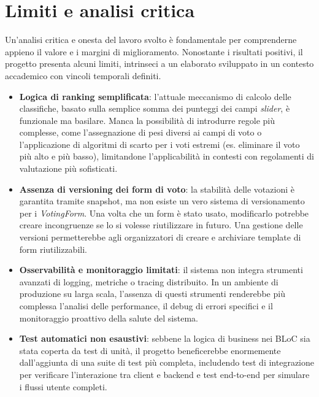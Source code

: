 \section{Limiti e analisi critica}\label{sec:limiti-e-analisi-critica}
Un'analisi critica e onesta del lavoro svolto è fondamentale per comprenderne appieno il valore e i margini di miglioramento.
Nonostante i risultati positivi, il progetto presenta alcuni limiti, intrinseci a un elaborato sviluppato in un contesto accademico con vincoli temporali definiti.
\begin{itemize}
    \item \textbf{Logica di ranking semplificata}: l'attuale meccanismo di calcolo delle classifiche, basato sulla semplice somma dei punteggi dei campi \emph{slider}, è funzionale ma basilare.
    Manca la possibilità di introdurre regole più complesse, come l'assegnazione di pesi diversi ai campi di voto o l'applicazione di algoritmi di scarto per i voti estremi (es.
    eliminare il voto più alto e più basso), limitandone l'applicabilità in contesti con regolamenti di valutazione più sofisticati.
    \item \textbf{Assenza di versioning dei form di voto}: la stabilità delle votazioni è garantita tramite snapshot, ma non esiste un vero sistema di versionamento per i \emph{VotingForm}.
    Una volta che un form è stato usato, modificarlo potrebbe creare incongruenze se lo si volesse riutilizzare in futuro.
    Una gestione delle versioni permetterebbe agli organizzatori di creare e archiviare template di form riutilizzabili.
    \item \textbf{Osservabilità e monitoraggio limitati}: il sistema non integra strumenti avanzati di logging, metriche o tracing distribuito.
    In un ambiente di produzione su larga scala, l'assenza di questi strumenti renderebbe più complessa l'analisi delle performance, il debug di errori specifici e il monitoraggio proattivo della salute del sistema.
    \item \textbf{Test automatici non esaustivi}: sebbene la logica di business nei BLoC sia stata coperta da test di unità, il progetto beneficerebbe enormemente dall'aggiunta di una suite di test più completa, includendo test di integrazione per verificare l'interazione tra client e backend e test end-to-end per simulare i flussi utente completi.
\end{itemize}

